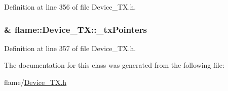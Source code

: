Definition at line 356 of file Device\-\_\-\-T\-X.\-h.

\hypertarget{classflame_1_1_device___t_x_a208fef1a96295f254b913180b5274160}{
\subsubsection[{\-\_\-tx\-Pointers}]{\& flame\-::\-Device\-\_\-\-T\-X\-::\-\_\-tx\-Pointers\hspace{0.3cm}{\ttfamily [protected]}}}\label{classflame_1_1_device___t_x_a208fef1a96295f254b913180b5274160}


Definition at line 357 of file Device\-\_\-\-T\-X.\-h.



The documentation for this class was generated from the following file\-:\begin{DoxyCompactItemize}
\item 
flame/\hyperlink{_device___t_x_8h}{Device\-\_\-\-T\-X.\-h}\end{DoxyCompactItemize}
